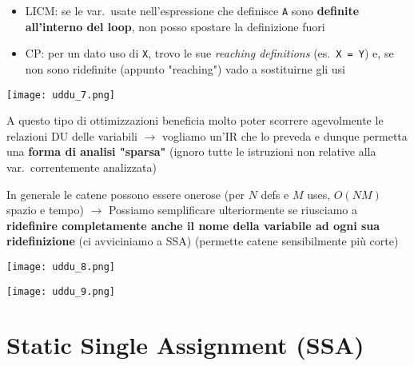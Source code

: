 \begin{example}[frametitle={Esempi}]
  \noindent 
  \begin{minipage}[c]{.65\textwidth}
    \begin{itemize}
      \item LICM: se le var.~usate nell'espressione che definisce \lstinline|A| sono \textbf{definite all'interno del loop}, non posso spostare la definizione fuori
      \item CP: per un dato uso di \lstinline|X|, trovo le sue \textit{reaching definitions} (es.~\lstinline|X = Y|) e, se non sono ridefinite (appunto "reaching") vado a sostituirne gli usi
    \end{itemize}

  \end{minipage}\hfill
  \begin{minipage}[c]{.25\textwidth}
    \texttt{[image: uddu\_7.png]}
  \end{minipage}

\noindent A questo tipo di ottimizzazioni beneficia molto poter scorrere agevolmente le relazioni DU delle variabili $\rightarrow$ vogliamo un'IR che lo preveda e dunque permetta una \textbf{forma di analisi "sparsa"} (ignoro tutte le istruzioni non relative alla var.~correntemente analizzata)
\end{example}

In generale le catene possono essere onerose (per $N$ defs e $M$ uses, $O(NM)$ spazio e tempo) $\rightarrow$ Possiamo semplificare ulteriormente se riusciamo a \textbf{ridefinire completamente anche il nome della variabile ad ogni sua ridefinizione} (ci avviciniamo a SSA) (permette catene sensibilmente pi\`u corte)

\noindent\begin{minipage}[b]{.45\textwidth}
  \centering
\texttt{[image: uddu\_8.png]}
\end{minipage}\hfill
\begin{minipage}[b]{.5\textwidth}
  \centering
\texttt{[image: uddu\_9.png]}
\end{minipage}

\section{Static Single Assignment (SSA)}


